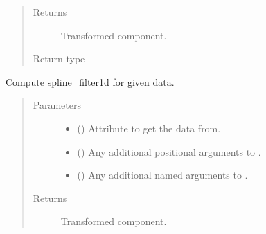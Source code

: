 \documentclass[letterpaper,10pt,english]{sphinxmanual}
\begin{document}
\begin{fulllineitems}
\begin{fulllineitems}
\begin{quote}
\begin{description}
\item[{Returns}] \leavevmode
{} \textendash{} Transformed component.

\item[{Return type}] \leavevmode
{\hyperref[\detokenize{api/base_classes:geology.src.base_spatial.SpatialComponent}]{}}

\end{description}\end{quote}

\end{fulllineitems}


\begin{fulllineitems}
\label{\detokenize{api/base_classes:geology.src.base_spatial.SpatialComponent.spline_filter1d}}
Compute spline\_filter1d for given data.
\begin{quote}\begin{description}
\item[{Parameters}] \leavevmode\begin{itemize}
\item {} 
 (\sphinxstyleliteralemphasis{\sphinxupquote{, }}) \textendash{} Attribute to get the data from.

\item {} 
 () \textendash{} Any additional positional arguments to .

\item {} 
 () \textendash{} Any additional named arguments to .

\end{itemize}

\item[{Returns}] \leavevmode
{} \textendash{} Transformed component.


\end{description}
\end{quote}
\end{fulllineitems}
\end{fulllineitems}
\end{document}
